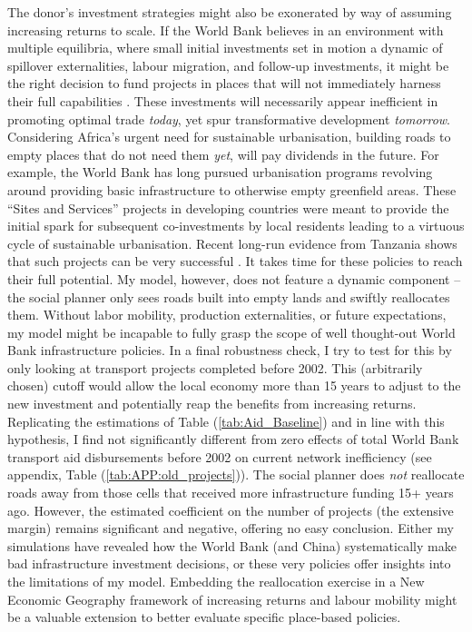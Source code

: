 \documentclass[11pt, oneside]{article}   	%
\let\oldref\ref
\renewcommand{\ref}[1]{(\oldref{#1})}
\begin{document}
The donor's investment strategies might also be exonerated by way of assuming increasing returns to scale. If the World Bank believes in an environment with multiple equilibria, where small initial investments set in motion a dynamic of spillover externalities, labour migration, and follow-up investments, it might be the right decision to fund projects in places that will not immediately harness their full capabilities \citep{krugman_history_1991,krugman_increasing_1991,Krugman_UrbanConcentrationRole_1996,Fujita_spatialeconomycities_1999,Duranton_PlaceBasedPoliciesDevelopment_2017}. These investments will necessarily appear inefficient in promoting optimal trade \emph{today}, yet spur transformative development \emph{tomorrow}. Considering Africa's urgent need for sustainable urbanisation, building roads to empty places that do not need them \emph{yet}, will pay dividends in the future. For example, the World Bank has long pursued urbanisation programs revolving around providing basic infrastructure to otherwise empty greenfield areas. These ``Sites and Services'' projects in developing countries were meant to provide the initial spark for subsequent co-investments by local residents leading to a virtuous cycle of sustainable urbanisation. Recent long-run evidence from Tanzania shows that such projects can be very successful \citep{Michaels_PlanningAheadBetter_2018}. It takes time for these policies to reach their full potential. My model, however, does not feature a dynamic component -- the social planner only sees roads built into empty lands and swiftly reallocates them. Without labor mobility, production externalities, or future expectations, my model might be incapable to fully grasp the scope of well thought-out World Bank infrastructure policies. In a final robustness check, I try to test for this by only looking at transport projects completed before 2002. This (arbitrarily chosen) cutoff would allow the local economy more than 15 years to adjust to the new investment and potentially reap the benefits from increasing returns. Replicating the estimations of Table \ref{tab:Aid_Baseline} and in line with this hypothesis, I find not significantly different from zero effects of total World Bank transport aid disbursements before 2002 on current network inefficiency (see appendix, Table \ref{tab:APP:old_projects}). The social planner does \emph{not} reallocate roads away from those cells that received more infrastructure funding 15+ years ago. However, the estimated coefficient on the number of projects (the extensive margin) remains significant and negative, offering no easy conclusion. Either my simulations have revealed how the World Bank (and China) systematically make bad infrastructure investment decisions, or these very policies offer insights into the limitations of my model. Embedding the reallocation exercise in a New Economic Geography framework of increasing returns and labour mobility might be a valuable extension to better evaluate specific place-based policies.
\end{document}
